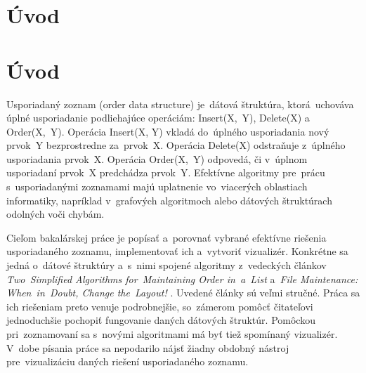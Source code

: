 \documentclass[
  digital,     %
  oneside,     %
  nosansbold,  %
  nocolorbold, %
  lof,         %
  lot,         %
]{fithesis4}
\begin{document}

\chapter*{Úvod}

\chapter*{Úvod}
Usporiadaný zoznam (order data structure) \cite{paper1_ordered_list}  je~dátová štruktúra, ktorá~uchováva úplné usporiadanie podliehajúce operáciám: Insert(X,~Y), Delete(X) a Order(X,~Y). Operácia Insert(X, Y) vkladá do~úplného usporiadania nový prvok~Y bezprostredne za~prvok~X. Operácia Delete(X) odstraňuje z~úplného usporiadania prvok~X. Operácia Order(X,~Y) odpovedá, či v~úplnom usporiadaní prvok~X predchádza prvok~Y.
Efektívne algoritmy pre~prácu s~usporiadanými zoznamami majú uplatnenie vo~viacerých oblastiach informatiky, napríklad v~grafových algoritmoch alebo dátových štruktúrach odolných voči chybám.

Cieľom bakalárskej práce je popísať a~porovnať vybrané efektívne riešenia usporiadaného zoznamu, implementovať ich a~vytvoriť vizualizér. Konkrétne sa jedná o~dátové štruktúry a~s~nimi spojené algoritmy z~vedeckých článkov \textit{Two~Simplified Algorithms for~Maintaining Order in~a~List} \cite{paper1_ordered_list} a~\textit{File Maintenance: When~in~Doubt, Change the~Layout!} \cite{paper2_file_maintenance}.
Uvedené články sú veľmi stručné. Práca sa ich riešeniam preto venuje podrobnejšie, so~zámerom pomôcť čitateľovi jednoduchšie pochopiť fungovanie daných dátových štruktúr. Pomôckou pri~zoznamovaní sa s~novými algoritmami má byť tiež spomínaný vizualizér. V~dobe písania práce sa nepodarilo nájsť žiadny obdobný nástroj pre~vizualizáciu daných riešení usporiadaného zoznamu.
\end{document}
